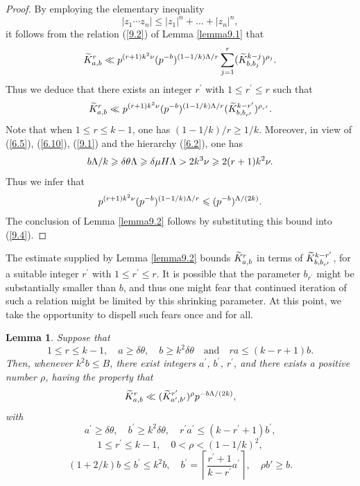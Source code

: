 \documentclass[12pt,reqno]{amsart}
\newtheorem{lemma}[theorem]{Lemma}
\theoremstyle{definition}
\theoremstyle{remark}
\numberwithin{equation}{section}
\def\del{{\delta}} \def\Del{{\Delta}} \def\Deltil{{\widetilde \Delta}}
\def\tet{{\theta}} \def\bftet{{\boldsymbol \theta}}
\def\le{\leqslant} \def\ge{\geqslant} \def\pleq{\preccurlyeq} \def\ple{\prec}
\begin{document}
\begin{proof} By employing the elementary inequality
$$|z_1\cdots z_n|\le |z_1|^n+\ldots +|z_n|^n,$$
it follows from the relation (\ref{9.2}) of Lemma \ref{lemma9.1} that
$$\widetilde K_{a,b}^r\ll p^{(r+1)k^2\nu }(p^{-b})^{(1-1/k){\Lambda}/r}\sum_{j=1}^r
(\widetilde K_{b,b_j}^{k-j})^{\rho_j}.$$
Thus we deduce that there exists an integer $r^\prime$ with $1\le r^\prime\le r$ such that
\begin{equation}\label{9.4}
\widetilde K_{a,b}^r\ll p^{(r+1)k^2\nu}(p^{-b})^{(1-1/k){\Lambda} /r}
(\widetilde K_{b,b_{r^\prime}}^{k-r^\prime})^{\rho_{r^\prime}}.
\end{equation}
Note that when $1\le r\le k-1$, one has $(1-1/k)/r\ge 1/k$. Moreover, in view of 
(\ref{6.5}), (\ref{6.10}), (\ref{9.1}) and the hierarchy (\ref{6.2}), one has
$$b\Lam/k\ge \del \tet \Lam \ge \del \mu H\Lam>2k^3\nu\ge 2(r+1)k^2\nu.$$
Thus we infer that
$$p^{(r+1)k^2\nu}(p^{-b})^{(1-1/k)\Lam/r}\le (p^{-b})^{\Lam/(2k)}.$$
The conclusion of Lemma \ref{lemma9.2} follows by substituting this bound into 
(\ref{9.4}).
\end{proof}

The estimate supplied by Lemma \ref{lemma9.2} bounds $\widetilde K_{a,b}^r$ in terms of 
$\widetilde K_{b,b_{r^\prime}}^{k-r^\prime}$, for a suitable integer $r^\prime$ with 
$1\le r^\prime\le r$. It is possible that the parameter $b_{r^\prime}$ might be 
substantially smaller than $b$, and thus one might fear that continued iteration of such a 
relation might be limited by this shrinking parameter. At this point, we take the opportunity 
to dispell such fears once and for all.

\begin{lemma}\label{lemma9.3} Suppose that
\begin{equation}\label{9.5}
1\le r\le k-1,\quad a\ge \del \tet,\quad b\ge k^2\del \tet\quad \text{and}\quad 
ra\le (k-r+1)b.
\end{equation}
Then, whenever $k^2b\le B$, there exist integers $a^\prime$, $b^\prime$, $r^\prime$, 
and there exists a positive number $\rho$, having the property that
\begin{equation}\label{9.6}
\widetilde K_{a,b}^r\ll (\widetilde K_{a^\prime,b^\prime}^{r^\prime})^\rho p^{-b{\Lambda} /(2k)},
\end{equation}
with
\begin{equation}\label{9.7}
a^\prime \ge \del \tet,\quad b^\prime \ge k^2\del \tet,\quad r^\prime a^\prime 
\le (k-r^\prime +1)b^\prime ,
\end{equation}
\begin{equation}\label{9.8}
1\le r^\prime \le k-1,\quad 0<\rho<(1-1/k)^2,
\end{equation}
\begin{equation}\label{9.9}
(1+2/k)b\le b^\prime \le k^2b,\quad b^\prime =\left\lceil \frac{r^\prime+1}{k-r^\prime}
a^\prime \right\rceil,\quad \rho b'\ge b.
\end{equation} 
\end{lemma}
\end{document}
